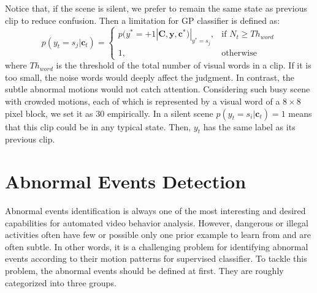 Notice that, if the scene is silent, we prefer to remain the same state as previous clip to reduce confusion. Then a limitation for GP classifier is defined as: 
\begin{equation}
	p(y_t=s_j|\mathbf{c}_t)=
	\begin{cases}
		p(y^*=+1|\mathbf{C},\mathbf{y},\mathbf{c}^*)|_{y^*=s_j},  & \mbox{if~} N_t\geq Th_{word}\\
		1, & \mbox{otherwise}
	\end{cases}
\end{equation}
where $Th_{word}$ is the threshold of the total number of visual words in a clip. If it is too small, the noise words would deeply affect the judgment. In contrast, the subtle abnormal motions would not catch attention. Considering such busy scene with crowded motions, each of which is represented by a visual word of a $8\times 8$ pixel block, we set it as $30$ empirically. In a silent scene $p(y_t=s_i|\mathbf{c}_t)=1$ means that this clip could be in any typical state. Then, $y_t$ has the same label as its previous clip.


\section{Abnormal Events Detection}
\label{framework:abnormal}
Abnormal events identification is always one of the most interesting and desired capabilities for automated video behavior analysis. 
However, dangerous or illegal activities often have few or possible only one prior example to learn from and are often subtle. 
In other words, it is a challenging problem for identifying abnormal events according to their motion patterns for supervised classifier. 
To tackle this problem, the abnormal events should be defined at first. They are roughly categorized into three groups.


